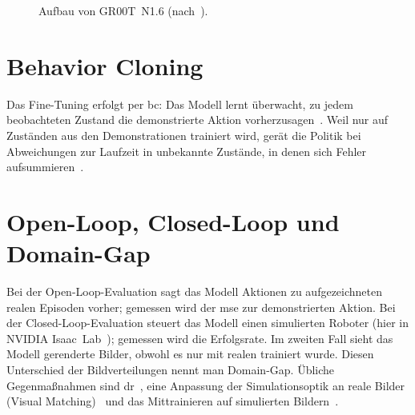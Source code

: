 \begin{figure}[htb]
  \centering
  \caption{Aufbau von GR00T~N1.6 (nach~\cite{groot2025}).}
  \label{fig:groot-architecture}
\end{figure}

\section{Behavior Cloning}
\label{sec:imitation-learning}
\label{sec:flow-matching}

Das Fine-Tuning erfolgt per \acf{bc}: Das Modell lernt überwacht, zu jedem
beobachteten Zustand die demonstrierte Aktion
vorherzusagen~\cite{hussein2017imitation}. Weil nur auf Zuständen aus den
Demonstrationen trainiert wird, gerät die Politik bei Abweichungen zur
Laufzeit in unbekannte Zustände, in denen sich Fehler
aufsummieren~\cite{ross2011dagger}.

\section{Open-Loop, Closed-Loop und Domain-Gap}
\label{sec:domain-gap-grundlagen}
\label{sec:lerobot}

Bei der Open-Loop-Evaluation sagt das Modell Aktionen zu aufgezeichneten
realen Episoden vorher; gemessen wird der \ac{mse} zur demonstrierten Aktion.
Bei der Closed-Loop-Evaluation steuert das Modell einen simulierten Roboter
(hier in NVIDIA Isaac~Lab~\cite{isaaclab2023}); gemessen wird die
Erfolgsrate. Im zweiten Fall sieht das Modell gerenderte Bilder, obwohl es nur
mit realen trainiert wurde. Diesen Unterschied der Bildverteilungen nennt man
Domain-Gap. Übliche Gegenmaßnahmen sind \acf{dr}~\cite{tobin2017domain}, eine
Anpassung der Simulationsoptik an reale Bilder (Visual
Matching)~\cite{simpler2024} und das Mittrainieren auf simulierten
Bildern~\cite{cotrain2025}.
